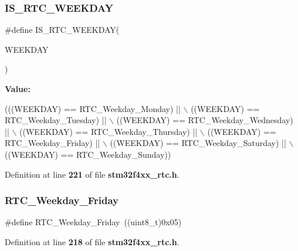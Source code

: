 \subsubsection{I\+S\+\_\+\+R\+T\+C\+\_\+\+W\+E\+E\+K\+D\+AY}
{\footnotesize\ttfamily \#define I\+S\+\_\+\+R\+T\+C\+\_\+\+W\+E\+E\+K\+D\+AY(\begin{DoxyParamCaption}\item[{}]{W\+E\+E\+K\+D\+AY }\end{DoxyParamCaption})}

{\bfseries Value\+:}
\begin{DoxyCode}
(((WEEKDAY) == RTC_Weekday_Monday) || \(\backslash\)
                                 ((WEEKDAY) == RTC_Weekday_Tuesday) || \(\backslash\)
                                 ((WEEKDAY) == RTC_Weekday_Wednesday) || \(\backslash\)
                                 ((WEEKDAY) == RTC_Weekday_Thursday) || \(\backslash\)
                                 ((WEEKDAY) == RTC_Weekday_Friday) || \(\backslash\)
                                 ((WEEKDAY) == RTC_Weekday_Saturday) || \(\backslash\)
                                 ((WEEKDAY) == RTC_Weekday_Sunday))
\end{DoxyCode}


Definition at line \textbf{ 221} of file \textbf{ stm32f4xx\+\_\+rtc.\+h}.

\mbox{\label{group__RTC__WeekDay__Definitions_ga556885ed7436fd0128e21ff48d7d0044}} 
\subsubsection{R\+T\+C\+\_\+\+Weekday\+\_\+\+Friday}
{\footnotesize\ttfamily \#define R\+T\+C\+\_\+\+Weekday\+\_\+\+Friday~((uint8\+\_\+t)0x05)}



Definition at line \textbf{ 218} of file \textbf{ stm32f4xx\+\_\+rtc.\+h}.

\mbox{\label{group__RTC__WeekDay__Definitions_ga7401371e61060e5d5fa2bf81f5369f02}} 
